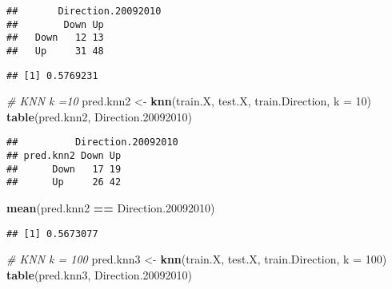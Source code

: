 \documentclass[]{article}
\newenvironment{Shaded}{\begin{snugshade}}{\end{snugshade}}
\newcommand{\KeywordTok}[1]{\textcolor[rgb]{0.13,0.29,0.53}{\textbf{#1}}}
\newcommand{\DataTypeTok}[1]{\textcolor[rgb]{0.13,0.29,0.53}{#1}}
\newcommand{\DecValTok}[1]{\textcolor[rgb]{0.00,0.00,0.81}{#1}}
\newcommand{\StringTok}[1]{\textcolor[rgb]{0.31,0.60,0.02}{#1}}
\newcommand{\CommentTok}[1]{\textcolor[rgb]{0.56,0.35,0.01}{\textit{#1}}}
\newcommand{\OperatorTok}[1]{\textcolor[rgb]{0.81,0.36,0.00}{\textbf{#1}}}
\newcommand{\NormalTok}[1]{#1}
\begin{document}
\begin{verbatim}
##       Direction.20092010
##        Down Up
##   Down   12 13
##   Up     31 48
\end{verbatim}

\begin{Shaded}
\end{Shaded}

\begin{verbatim}
## [1] 0.5769231
\end{verbatim}

\begin{Shaded}
\begin{Highlighting}[]
\CommentTok{# KNN k =10}
\NormalTok{pred.knn2 <-}\StringTok{ }\KeywordTok{knn}\NormalTok{(train.X, test.X, train.Direction, }\DataTypeTok{k =} \DecValTok{10}\NormalTok{)}
\KeywordTok{table}\NormalTok{(pred.knn2, Direction.}\DecValTok{20092010}\NormalTok{)}
\end{Highlighting}
\end{Shaded}

\begin{verbatim}
##          Direction.20092010
## pred.knn2 Down Up
##      Down   17 19
##      Up     26 42
\end{verbatim}

\begin{Shaded}
\begin{Highlighting}[]
\KeywordTok{mean}\NormalTok{(pred.knn2 }\OperatorTok{==}\StringTok{ }\NormalTok{Direction.}\DecValTok{20092010}\NormalTok{)}
\end{Highlighting}
\end{Shaded}

\begin{verbatim}
## [1] 0.5673077
\end{verbatim}

\begin{Shaded}
\begin{Highlighting}[]
\CommentTok{# KNN k = 100}
\NormalTok{pred.knn3 <-}\StringTok{ }\KeywordTok{knn}\NormalTok{(train.X, test.X, train.Direction, }\DataTypeTok{k =} \DecValTok{100}\NormalTok{)}
\KeywordTok{table}\NormalTok{(pred.knn3, Direction.}\DecValTok{20092010}\NormalTok{)}
\end{Highlighting}
\end{Shaded}
\end{document}
